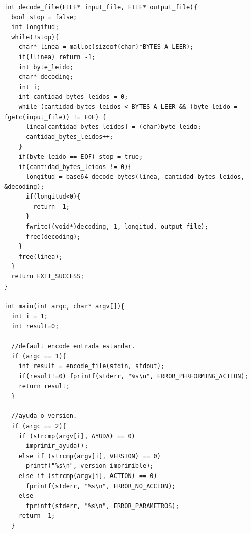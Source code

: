 \documentclass[11pt]{article}
\begin{document}
\begin{lstlisting}[style=Cstyle]
int decode_file(FILE* input_file, FILE* output_file){
  bool stop = false;
  int longitud;
  while(!stop){
    char* linea = malloc(sizeof(char)*BYTES_A_LEER);
    if(!linea) return -1;
    int byte_leido;
    char* decoding;
    int i;
    int cantidad_bytes_leidos = 0;
    while (cantidad_bytes_leidos < BYTES_A_LEER && (byte_leido = fgetc(input_file)) != EOF) {
      linea[cantidad_bytes_leidos] = (char)byte_leido;
      cantidad_bytes_leidos++;
    }
    if(byte_leido == EOF) stop = true;
    if(cantidad_bytes_leidos != 0){
      longitud = base64_decode_bytes(linea, cantidad_bytes_leidos, &decoding);
      if(longitud<0){
        return -1;
      }
      fwrite((void*)decoding, 1, longitud, output_file);
      free(decoding);
    }
    free(linea);
  }
  return EXIT_SUCCESS;
}

int main(int argc, char* argv[]){
  int i = 1;
  int result=0;

  //default encode entrada estandar.
  if (argc == 1){
    int result = encode_file(stdin, stdout);
    if(result!=0) fprintf(stderr, "%s\n", ERROR_PERFORMING_ACTION);
    return result;
  }

  //ayuda o version.
  if (argc == 2){
    if (strcmp(argv[i], AYUDA) == 0)
      imprimir_ayuda();
    else if (strcmp(argv[i], VERSION) == 0)
      printf("%s\n", version_imprimible);
    else if (strcmp(argv[i], ACTION) == 0)
      fprintf(stderr, "%s\n", ERROR_NO_ACCION);
    else
      fprintf(stderr, "%s\n", ERROR_PARAMETROS);
    return -1;
  }


\end{lstlisting}
\end{document}
